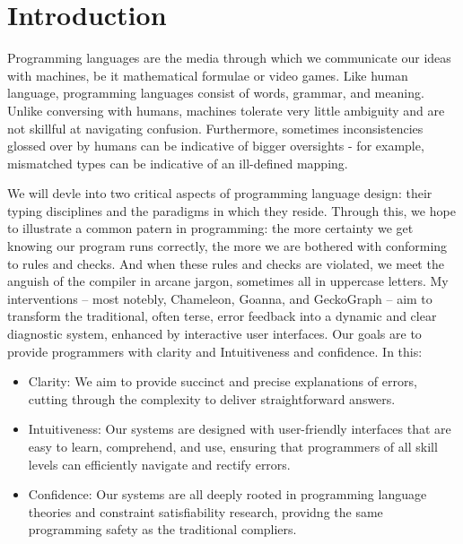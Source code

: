 
\chapter{Introduction}

\label{chap:introduction} 

\graphicspath{{Figures/Introduction}}

Programming languages are the media through which we communicate our ideas with machines, be it mathematical formulae or video games. Like human language, programming languages consist of words, grammar, and meaning. Unlike conversing with humans, machines tolerate very little ambiguity and are not skillful at navigating confusion. Furthermore, sometimes inconsistencies glossed over by humans can be indicative of bigger oversights - for example, mismatched types can be indicative of an ill-defined mapping. 

We will devle into two critical aspects of programming language design: their typing disciplines and the paradigms in which they reside. Through this, we hope to illustrate a common patern in programming: the more certainty we get knowing our program runs correctly, the more we are bothered with conforming to rules and checks. And when these rules and checks are violated, we meet the anguish of the compiler in arcane jargon, sometimes all in uppercase letters. My interventions -- most notebly, Chameleon, Goanna, and GeckoGraph -- aim to transform the traditional, often terse, error feedback into a dynamic and clear diagnostic system, enhanced by interactive user interfaces. Our goals are to provide programmers with clarity and Intuitiveness and confidence. In this:

\begin{itemize}
  \item Clarity: We aim to provide succinct and precise explanations of errors, cutting through the complexity to deliver straightforward answers.
  \item Intuitiveness: Our systems are designed with user-friendly interfaces that are easy to learn, comprehend, and use, ensuring that programmers of all skill levels can efficiently navigate and rectify errors.
  \item Confidence: Our systems are all deeply rooted in programming language theories and constraint satisfiability research, providng the same programming safety as the traditional compliers.  
\end{itemize}

